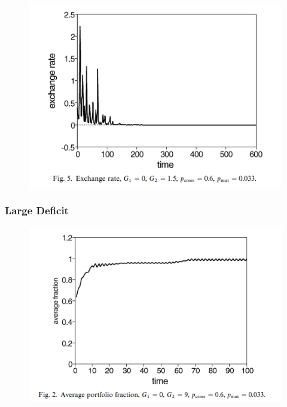 \begin{frame}

    \begin{figure}
        \includegraphics[width = \textwidth]{fig/small_e.png}
    \end{figure}

\end{frame}


\begin{frame}
    \frametitle{Large Deficit}

    \begin{figure}
        \includegraphics[width = \textwidth]{fig/large_p.png}
    \end{figure}

\end{frame}


